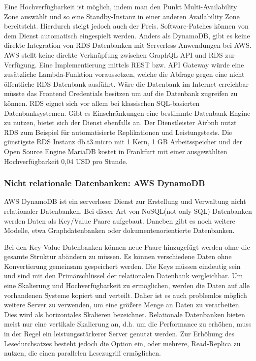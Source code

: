 Eine Hochverfügbarkeit ist möglich, indem man den Punkt Multi-Availability Zone auswählt und so eine Standby-Instanz in einer anderen Availability Zone bereitsteht.
Hierdurch steigt jedoch auch der Preis. Software-Patches können von dem Dienst automatisch eingespielt werden.
Anders als DynamoDB, gibt es keine direkte Integration von RDS Datenbanken mit Serverless Anwendungen bei AWS.
AWS stellt keine direkte Verknüpfung zwischen GraphQL API und RDS zur Verfügung. Eine Implementierung mittels REST bzw. API Gateway würde eine zusätzliche Lambda-Funktion voraussetzen, welche
die Abfrage gegen eine nicht öffentliche RDS Datenbank ausführt. Wäre die Datenbank im Internet erreichbar müsste das Frontend Credentials besitzen um auf die Datenbank zugreifen zu können.
RDS eignet sich vor allem bei klassischen SQL-basierten Datenbanksystemen. Gibt es Einschränkungen eine bestimmte Datenbank-Engine zu nutzen, bietet sich der Dienst ebenfalls an.
Der Dienstleister Airbnb nutzt RDS zum Beispiel für automatisierte Replikationen und Leistungstests.
Die günstigste RDS Instanz \glqq db.t3.micro\grqq{} mit 1 Kern, 1 GB Arbeitsspeicher und der Open Source Engine MariaDB kostet in Frankfurt mit einer ausgewählten Hochverfügbarkeit 0,04 USD pro Stunde. \cite[]{RDS}


\subsubsection{Nicht relationale Datenbanken: AWS DynamoDB}
\label{DynamoDB}

AWS DynamoDB ist ein serverloser Dienst zur Erstellung und Verwaltung nicht relationaler Datenbanken.
Bei dieser Art von NoSQL(not only SQL)-Datenbanken werden Daten als Key/Value Paare aufgebaut. Daneben gibt es noch weitere Modelle, etwa Graphdatenbanken oder dokumentenorientierte
Datenbanken.

Bei den Key-Value-Datenbanken können neue Paare hinzugefügt werden ohne die gesamte Struktur abändern zu müssen.
Es können verschiedene Daten ohne Konvertierung gemeinsam gespeichert werden.
Die Keys müssen eindeutig sein und sind mit den Primärschlüssel der relationalen Datenbank vergleichbar.
Um eine Skalierung und Hochverfügbarkeit zu ermöglichen, werden die Daten auf alle vorhandenen Systeme kopiert und verteilt. Daher ist es auch problemlos möglich weitere
Server zu verwenden, um eine größere Menge an Daten zu verarbeiten. Dies wird als horizontales Skalieren bezeichnet.
Relationale Datenbanken bieten meist nur eine vertikale Skalierung an, d.h. um die Performance zu erhöhen, muss in der Regel ein leistungsstärkerer Server genutzt werden.
Zur Erhöhung des Lesedurchsatzes besteht jedoch die Option ein, oder mehrere, Read-Replica zu nutzen, die einen parallelen Lesezugriff ermöglichen.

